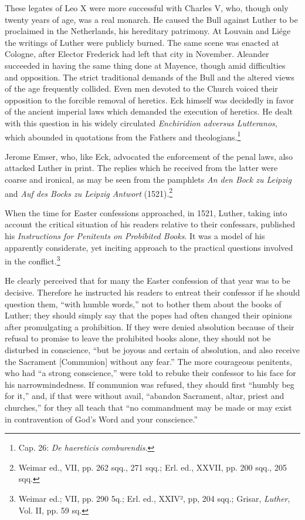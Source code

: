 These legates of Leo X were more successful with Charles V, who,
though only twenty years of age, was a real monarch. He caused
the Bull against Luther to be proclaimed in the Netherlands, his
hereditary patrimony. At Louvain and Liége the writings of Luther
were publicly burned. The same scene was enacted at Cologne, after
Elector Frederick had left that city in November. Aleander succeeded
in having the same thing done at Mayence, though amid difficulties
and opposition. The strict traditional demands of the Bull and the
altered views of the age frequently collided. Even men devoted to
the Church voiced their opposition to the forcible removal of heretics.
Eck himself was decidedly in favor of the ancient imperial laws
which demanded the execution of heretics. He dealt with this question
in his widely circulated \textit{Enchiridion adversus Lutteranos}, which
abounded in quotations from the Fathers and theologians.\footnote
{Cap. 26: \textit{De haereticis comburendis}.}

Jerome Emser, who, like Eck, advocated the enforcement of the
penal laws, also attacked Luther in print. The replies which he received
from the latter were coarse and ironical, as may be seen from
the pamphlets \textit{An den Bock zu Leipzig} and \textit{Auf des Bocks zu Leipzig
Antwort} (1521).\footnote{Weimar ed., VII, pp. 262 sqq., 271 sqq.; Erl. ed., XXVII, pp. 200 sqq., 205 sqq.}

When the time for Easter confessions approached, in 1521, Luther,
taking into account the critical situation of his readers relative to
their confessars, published his \textit{Instructions for Penitents on Probibited
Books}. It was a model of his apparently considerate, yet inciting approach
to the practical questions involved in the conflict.\footnote{Weimar ed.; VII, pp. 290 5q.; Erl. ed., XXIV², pp, 204 sqq.; Grisar, \textit{Luther}, Vol. II,
pp. 59 sq.}

He clearly perceived that for many the Easter confession of that year
was to be decisive. Therefore he instructed his readers to entreat their
confessor if he should question them, “with humble words,” not to bother them
about the books of Luther; they should simply say that the popes had often
changed their opinions after promulgating a prohibition. If they were denied
absolution because of their refusal to promise to leave the prohibited books
alone, they should not be disturbed in conscience, “but be joyous and certain
of absolution, and also receive the Sacrament [Communion] without any
fear.” The more courageous penitents, who had “a strong conscience,” were
told to rebuke their confessor to his face for his narrowmindedness. If communion
was refused, they should first “humbly beg for it,” and, if that were
without avail, “abandon Sacrament, altar, priest and churches,” for they
all teach that “no commandment may be made or may exist in contravention
of God’s Word and your conscience.”


